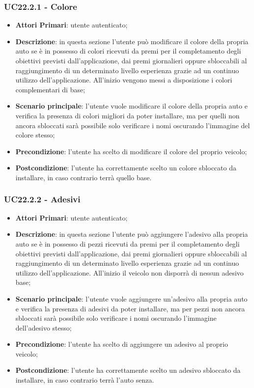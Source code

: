 \subsubsection{UC22.2.1 - Colore}
\begin{itemize}
	\item \textbf{Attori Primari}: utente autenticato;
	\item \textbf{Descrizione}: in questa sezione l'utente può modificare il colore della propria auto se è in possesso di colori ricevuti da premi per il completamento degli obiettivi previsti dall'applicazione, dai premi giornalieri oppure sbloccabili al raggiungimento di un determinato livello esperienza grazie ad un continuo utilizzo dell'applicazione.
	All'inizio vengono messi a disposizione i colori complementari di base;
	\item \textbf{Scenario principale}: l'utente vuole modificare il colore della propria auto e verifica la presenza di colori migliori da poter installare, ma per quelli non ancora sbloccati sarà possibile solo verificare i nomi oscurando l'immagine del colore stesso;
	\item \textbf{Precondizione}: l'utente ha scelto di modificare il colore del proprio veicolo; 
	\item \textbf{Postcondizione}: l'utente ha correttamente scelto un colore sbloccato da installare, in caso contrario terrà quello base.
\end{itemize}
\subsubsection{UC22.2.2 - Adesivi}
\begin{itemize}
	\item \textbf{Attori Primari}: utente autenticato;
	\item \textbf{Descrizione}: in questa sezione l'utente può aggiungere l'adesivo alla propria auto se è in possesso di pezzi ricevuti da premi per il completamento degli obiettivi previsti dall'applicazione, dai premi giornalieri oppure sbloccabili al raggiungimento di un determinato livello esperienza grazie ad un continuo utilizzo dell'applicazione.
	All'inizio il veicolo non disporrà di nessun adesivo base;
	\item \textbf{Scenario principale}: l'utente vuole aggiungere un'adesivo alla propria auto e verifica la presenza di adesivi da poter installare, ma per pezzi non ancora sbloccati sarà possibile solo verificare i nomi oscurando l'immagine dell'adesivo stesso;
	\item \textbf{Precondizione}: l'utente ha scelto di aggiungere un adesivo al proprio veicolo; 
	\item \textbf{Postcondizione}: l'utente ha correttamente scelto un adesivo sbloccato da installare, in caso contrario terrà l'auto senza.
\end{itemize}
